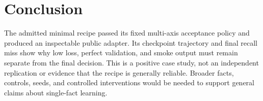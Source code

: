 \section{Conclusion}
The admitted minimal recipe passed its fixed multi-axis acceptance policy and
produced an inspectable public adapter. Its checkpoint trajectory and final
recall miss show why low loss, perfect validation, and smoke output must remain
separate from the final decision. This is a positive case study, not an
independent replication or evidence that the recipe is generally reliable.
Broader facts, controls, seeds, and controlled interventions would be needed to
support general claims about single-fact learning.
